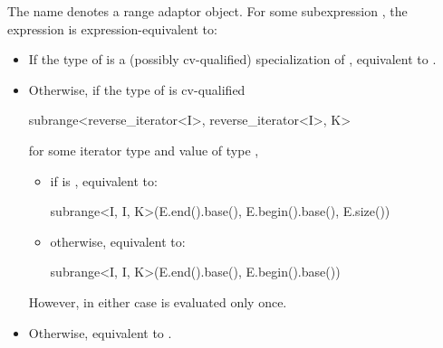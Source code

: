\pnum
The name  denotes a
range adaptor object.
For some subexpression , the expression
 is expression-equivalent to:
\begin{itemize}
\item
  If the type of  is
  a (possibly cv-qualified) specialization of ,
  equivalent to .
\item
  Otherwise, if the type of  is cv-qualified
\begin{codeblock}
subrange<reverse_iterator<I>, reverse_iterator<I>, K>
\end{codeblock}
  for some iterator type  and
  value  of type ,
  \begin{itemize}
  \item
    if  is , equivalent to:
\begin{codeblock}
subrange<I, I, K>(E.end().base(), E.begin().base(), E.size())
\end{codeblock}
  \item
    otherwise, equivalent to:
\begin{codeblock}
subrange<I, I, K>(E.end().base(), E.begin().base())
\end{codeblock}
  \end{itemize}
  However, in either case  is evaluated only once.
\item
  Otherwise, equivalent to .
\end{itemize}
